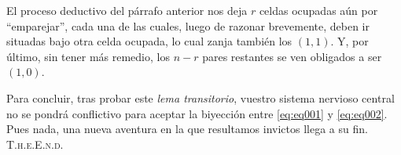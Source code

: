 \documentclass{article}
\begin{document}
El proceso deductivo del párrafo anterior nos deja $r$ celdas ocupadas aún por ``emparejar'', cada una de las cuales, luego de razonar brevemente, deben ir situadas bajo otra celda ocupada, lo cual zanja también los $(1, 1)$. Y, por último, sin tener más remedio, los $n - r$ pares restantes se ven obligados a ser $(1, 0)$.

Para concluir, tras probar este \textit{lema transitorio}, vuestro sistema nervioso central no se pondrá conflictivo para aceptar la biyección entre \eqref{eq:eq001} y \eqref{eq:eq002}. Pues nada, una nueva aventura en la que resultamos invictos llega a su fin. \hfill{\textsc{T.h.e.E.n.d.}}
\end{document}

